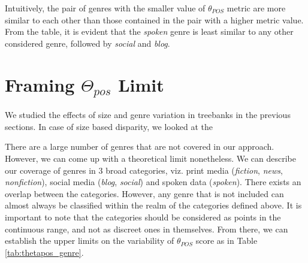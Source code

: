 \begin{table}[H]
\centering
{}
\caption{\(\theta_{POS}\) Scores (\(\pm\) sd) for Genre Optimization (Averaged over 100 runs)}
\label{tab:klcpos3-confusion-results}
\end{table}

Intuitively, the pair of genres with the smaller value of \(\theta_{POS}\) metric are more similar to each other than those contained in the pair with a higher metric value. From the table, it is evident that the \textit{spoken} genre is least similar to any other considered genre, followed by \textit{social} and \textit{blog}. 


\section{Framing \(\Theta_{pos}\) Limit}
\label{sec:pos-harmony-calculations}

We studied the effects of size and genre variation in treebanks in the previous sections. In case of size based disparity, we looked at the 

There are a large number of genres that are not covered in our approach. However, we can come up with a theoretical limit nonetheless. We can describe our coverage of genres in 3 broad categories, viz. print media (\textit{fiction}, \textit{news}, \textit{nonfiction}), social media (\textit{blog}, \textit{social}) and spoken data (\textit{spoken}). There exists an overlap between the categories. However, any genre that is not included can almost always be classified within the realm of the categories defined above. It is important to note that the categories should be considered as points in the continuous range, and not as discreet ones in themselves. From there, we can establish the upper limits on the variability of \(\theta_{POS}\) score as in Table \ref{tab:thetapos_genre}.

